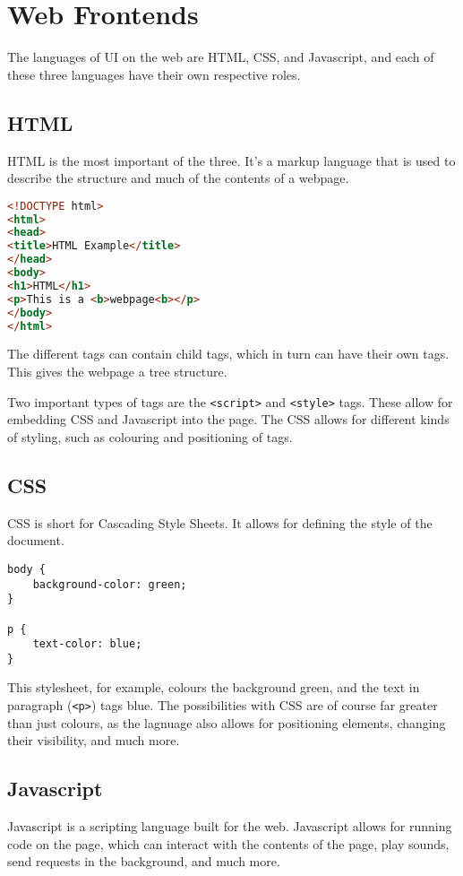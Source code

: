 \section{Web Frontends}
The languages of UI on the web are HTML, CSS, and Javascript, and each of these three languages have their own respective roles.\cite{nixonweb}
\subsection{HTML}
HTML is the most important of the three.
It's a markup language that is used to describe the structure and much of the contents of a webpage.
\begin{lstlisting}[language=HTML]
<!DOCTYPE html>
<html>
<head>
<title>HTML Example</title>
</head>
<body>
<h1>HTML</h1>
<p>This is a <b>webpage<b></p>
</body>
</html>
\end{lstlisting}
The different tags can contain child tags, which in turn can have their own tags.
This gives the webpage a tree structure.

Two important types of tags are the \texttt{<script>} and \texttt{<style>} tags.
These allow for embedding CSS and Javascript into the page.
The CSS allows for different kinds of styling, such as colouring and positioning of tags.
\subsection{CSS}
CSS is short for Cascading Style Sheets. It allows for defining the style of the document.
\begin{lstlisting}
body {
	background-color: green;
}

p {
	text-color: blue;
}
\end{lstlisting}
This stylesheet, for example, colours the background green, and the text in paragraph (\texttt{<p>}) tags blue. The possibilities with CSS are of course far greater than just colours, as the lagnuage also allows for positioning elements, changing their visibility, and much more.\cite{nixonweb}
\subsection{Javascript}
Javascript is a scripting language built for the web.
Javascript allows for running code on the page, which can interact with the contents of the page, play sounds, send requests in the background, and much more.\cite{nixonweb}

